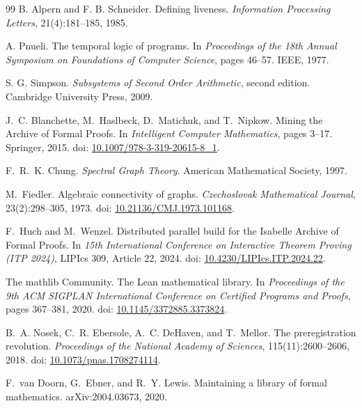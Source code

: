 \documentclass[11pt]{article}
\theoremstyle{plain}
\theoremstyle{definition}
\theoremstyle{remark}
\begin{document}
\begin{thebibliography}{99}
B. Alpern and F. B. Schneider.
\newblock Defining liveness.
\newblock \emph{Information Processing Letters}, 21(4):181--185, 1985.

A. Pnueli.
\newblock The temporal logic of programs.
\newblock In \emph{Proceedings of the 18th Annual Symposium on Foundations of
Computer Science}, pages 46--57. IEEE, 1977.

S. G. Simpson.
\newblock \emph{Subsystems of Second Order Arithmetic}, second edition.
\newblock Cambridge University Press, 2009.

J.~C. Blanchette, M.~Haslbeck, D.~Matichuk, and T.~Nipkow.
\newblock Mining the Archive of Formal Proofs.
\newblock In \emph{Intelligent Computer Mathematics}, pages 3--17. Springer, 2015.
\newblock doi: \href{https://doi.org/10.1007/978-3-319-20615-8_1}{10.1007/978-3-319-20615-8\_1}.

F.~R.~K. Chung.
\newblock \emph{Spectral Graph Theory}.
\newblock American Mathematical Society, 1997.

M.~Fiedler.
\newblock Algebraic connectivity of graphs.
\newblock \emph{Czechoslovak Mathematical Journal}, 23(2):298--305, 1973.
\newblock doi: \href{https://doi.org/10.21136/CMJ.1973.101168}{10.21136/CMJ.1973.101168}.

F.~Huch and M.~Wenzel.
\newblock Distributed parallel build for the Isabelle Archive of Formal Proofs.
\newblock In \emph{15th International Conference on Interactive Theorem Proving (ITP 2024)},
LIPIcs 309, Article 22, 2024.
\newblock doi: \href{https://doi.org/10.4230/LIPIcs.ITP.2024.22}{10.4230/LIPIcs.ITP.2024.22}.

The mathlib Community.
\newblock The Lean mathematical library.
\newblock In \emph{Proceedings of the 9th ACM SIGPLAN International Conference on Certified Programs and Proofs},
pages 367--381, 2020.
\newblock doi: \href{https://doi.org/10.1145/3372885.3373824}{10.1145/3372885.3373824}.

B.~A. Nosek, C.~R. Ebersole, A.~C. DeHaven, and T.~Mellor.
\newblock The preregistration revolution.
\newblock \emph{Proceedings of the National Academy of Sciences}, 115(11):2600--2606, 2018.
\newblock doi: \href{https://doi.org/10.1073/pnas.1708274114}{10.1073/pnas.1708274114}.

F.~van Doorn, G.~Ebner, and R.~Y. Lewis.
\newblock Maintaining a library of formal mathematics.
\newblock arXiv:2004.03673, 2020.
\end{thebibliography}
\end{document}
